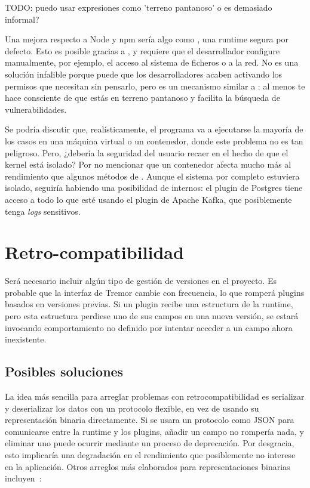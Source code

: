 TODO: puedo usar expresiones como 'terreno pantanoso' o es demasiado informal?

Una mejora respecto a Node y npm sería algo como , una runtime
segura por defecto. Esto es posible gracias a \sandboxing, y requiere que el
desarrollador configure manualmente, por ejemplo, el acceso al sistema de
ficheros o a la red. No es una solución infalible porque puede que los
desarrolladores acaben activando los permisos que necesitan sin pensarlo, pero
es un mecanismo similar a \unsafe: al menos te hace consciente de que estás en
terreno pantanoso y facilita la búsqueda de vulnerabilidades.

Se podría discutir que, realísticamente, el programa va a ejecutarse la mayoría
de los casos en una máquina virtual o un contenedor, donde este problema no es
tan peligroso. Pero, ¿debería la seguridad del usuario recaer en el hecho de que
el kernel está isolado? Por no mencionar que un contenedor afecta mucho más al
rendimiento que algunos métodos de \sandboxing. Aunque el sistema por completo
estuviera isolado, seguiría habiendo una posibilidad de \leaks internos: el
plugin de Postgres tiene acceso a todo lo que esté usando el plugin de Apache
Kafka, que posiblemente tenga \emph{logs} sensitivos.

\section{Retro-compatibilidad}\label{sec:compat}

Será necesario incluir algún tipo de gestión de versiones en el proyecto. Es
probable que la interfaz de Tremor cambie con frecuencia, lo que romperá plugins
basados en versiones previas. Si un plugin recibe una estructura de la runtime,
pero esta estructura perdiese uno de sus campos en una nueva versión, se estará
invocando comportamiento no definido por intentar acceder a un campo ahora
inexistente.

\subsection{Posibles soluciones}

La idea más sencilla para arreglar problemas con retrocompatibilidad es
serializar y deserializar los datos con un protocolo flexible, en vez de usando
su representación binaria directamente. Si se usara un protocolo como JSON para
comunicarse entre la runtime y los plugins, añadir un campo no rompería nada, y
eliminar uno puede ocurrir mediante un proceso de deprecación. Por desgracia,
esto implicaría una degradación en el rendimiento que posiblemente no interese
en la aplicación. Otros arreglos más elaborados para representaciones binarias
incluyen~\cite{swiftabi}:

